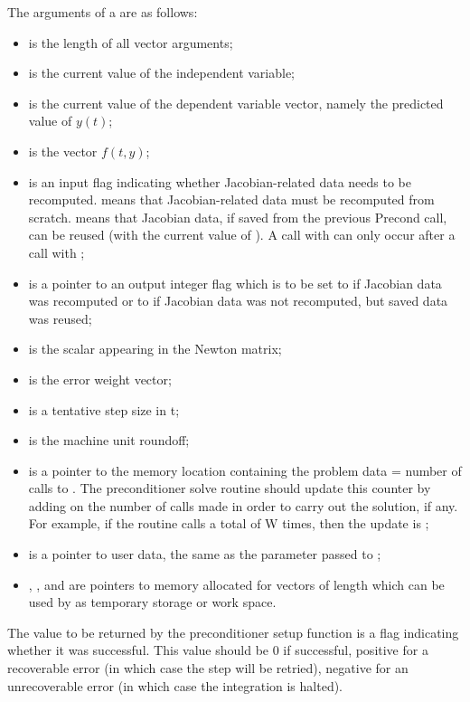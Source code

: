 \begin{itemize}
  The arguments of a  are as follows:
  \begin{itemize}
  \item 
     is the length of all vector arguments;
  \item 
     is the current value of the independent variable;
  \item 
     is the current value of the dependent variable vector, 
    namely the predicted value of $y(t)$;
  \item 
     is the vector $f(t,y)$;                                  
  \item 
     is an input flag indicating whether Jacobian-related   
    data needs to be recomputed.
     means that Jacobian-related data   
    must be recomputed from scratch.                                 
      means that Jacobian data, if saved from 
    the previous Precond call, can be reused      
    (with the current value of ).            
    A call with  can only occur after   
    a call with ;
  \item 
     is a pointer to an output integer flag which is        
    to be set to  if Jacobian data was recomputed or   
    to  if Jacobian data was not           
    recomputed, but saved data was reused;
  \item 
     is the scalar appearing in the Newton matrix;
  \item 
     is the error weight vector;                  
  \item 
     is a tentative step size in t;
  \item 
     is the machine unit roundoff;
  \item 
     is a pointer to the memory location containing the      
    {\cvodes} problem data  = number of calls to . 
    The preconditioner solve routine should update this counter by 
    adding on the number of  calls made in order to carry out     
    the solution, if any.  For example, if the routine      
    calls  a total of W times, then the update is          
    ;
  \item 
     is a pointer to user data, the same as the       
    parameter passed to ;
  \item 
    , , and  are pointers to memory allocated    
    for vectors of length  which can be used by           
     as temporary storage or work space.    
  \end{itemize}
  
  The value to be returned by the preconditioner setup function is a flag indicating 
  whether it was successful.  This value should be $0$ if successful, 
  positive for a recoverable error (in which case the step will be retried),     
  negative for an unrecoverable error (in which case the integration is halted). 
  
\end{itemize}

